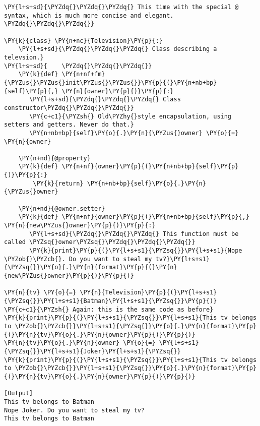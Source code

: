 \begin{Verbatim}[label=\makebox{\url{https://bitbucket.org/lbaldini/programming/src/tip/snippets/class\_tv\_encapsulation\_properties.py}},commandchars=\\\{\}]
\PY{l+s+sd}{\PYZdq{}\PYZdq{}\PYZdq{} This time with the special @ syntax, which is much more concise and elegant. \PYZdq{}\PYZdq{}\PYZdq{}}

\PY{k}{class} \PY{n+nc}{Television}\PY{p}{:}
    \PY{l+s+sd}{\PYZdq{}\PYZdq{}\PYZdq{} Class describing a televsion.}
\PY{l+s+sd}{    \PYZdq{}\PYZdq{}\PYZdq{}}
    \PY{k}{def} \PY{n+nf+fm}{\PYZus{}\PYZus{}init\PYZus{}\PYZus{}}\PY{p}{(}\PY{n+nb+bp}{self}\PY{p}{,} \PY{n}{owner}\PY{p}{)}\PY{p}{:}
       \PY{l+s+sd}{\PYZdq{}\PYZdq{}\PYZdq{} Class constructor\PYZdq{}\PYZdq{}\PYZdq{}}
       \PY{c+c1}{\PYZsh{} Old\PYZhy{}style encapsulation, using setters and getters. Never do that.}
       \PY{n+nb+bp}{self}\PY{o}{.}\PY{n}{\PYZus{}owner} \PY{o}{=} \PY{n}{owner}
    
    \PY{n+nd}{@property}
    \PY{k}{def} \PY{n+nf}{owner}\PY{p}{(}\PY{n+nb+bp}{self}\PY{p}{)}\PY{p}{:}
        \PY{k}{return} \PY{n+nb+bp}{self}\PY{o}{.}\PY{n}{\PYZus{}owner}

    \PY{n+nd}{@owner.setter}
    \PY{k}{def} \PY{n+nf}{owner}\PY{p}{(}\PY{n+nb+bp}{self}\PY{p}{,} \PY{n}{new\PYZus{}owner}\PY{p}{)}\PY{p}{:}
       \PY{l+s+sd}{\PYZdq{}\PYZdq{}\PYZdq{} This function must be called \PYZsq{}owner\PYZsq{}\PYZdq{}\PYZdq{}\PYZdq{}}
       \PY{k}{print}\PY{p}{(}\PY{l+s+s1}{\PYZsq{}}\PY{l+s+s1}{Nope \PYZob{}\PYZcb{}. Do you want to steal my tv?}\PY{l+s+s1}{\PYZsq{}}\PY{o}{.}\PY{n}{format}\PY{p}{(}\PY{n}{new\PYZus{}owner}\PY{p}{)}\PY{p}{)}
 
\PY{n}{tv} \PY{o}{=} \PY{n}{Television}\PY{p}{(}\PY{l+s+s1}{\PYZsq{}}\PY{l+s+s1}{Batman}\PY{l+s+s1}{\PYZsq{}}\PY{p}{)}
\PY{c+c1}{\PYZsh{} Again: this is the same code as before}
\PY{k}{print}\PY{p}{(}\PY{l+s+s1}{\PYZsq{}}\PY{l+s+s1}{This tv belongs to \PYZob{}\PYZcb{}}\PY{l+s+s1}{\PYZsq{}}\PY{o}{.}\PY{n}{format}\PY{p}{(}\PY{n}{tv}\PY{o}{.}\PY{n}{owner}\PY{p}{)}\PY{p}{)} 
\PY{n}{tv}\PY{o}{.}\PY{n}{owner} \PY{o}{=} \PY{l+s+s1}{\PYZsq{}}\PY{l+s+s1}{Joker}\PY{l+s+s1}{\PYZsq{}}
\PY{k}{print}\PY{p}{(}\PY{l+s+s1}{\PYZsq{}}\PY{l+s+s1}{This tv belongs to \PYZob{}\PYZcb{}}\PY{l+s+s1}{\PYZsq{}}\PY{o}{.}\PY{n}{format}\PY{p}{(}\PY{n}{tv}\PY{o}{.}\PY{n}{owner}\PY{p}{)}\PY{p}{)}

[Output]
This tv belongs to Batman
Nope Joker. Do you want to steal my tv?
This tv belongs to Batman
\end{Verbatim}